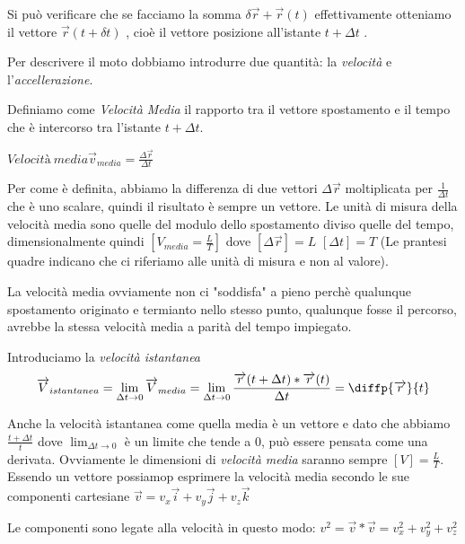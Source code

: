 Si può verificare che se facciamo la somma  $ \delta \overrightarrow{r} + \overrightarrow{r} ( t ) $ effettivamente otteniamo il vettore $ \overrightarrow{r} ( t + \delta t ) $ , cioè il vettore posizione all'istante $ t + \Delta t $ .

Per descrivere il moto dobbiamo introdurre due quantità: la \textit{velocità} e l'\textit{accellerazione}.

Definiamo come \textit{Velocità Media} il rapporto tra il vettore spostamento e il tempo che è intercorso 
tra l'istante $ t + \Delta t$. 


$Velocità\   media \overrightarrow{v}_{media} =\frac{\Delta \overrightarrow{r} }{\Delta t} $ 


Per come è definita, abbiamo la differenza di due vettori $\Delta \overrightarrow{r} $
moltiplicata per $\frac{1}{\Delta t}$ che è uno scalare, quindi il risultato è sempre
un vettore. 
Le unità di misura della velocità media sono quelle del modulo dello spostamento
diviso quelle del tempo, dimensionalmente quindi $[V_{media}= \frac{L}{T} ]$ dove $[\Delta\overrightarrow{r}]= L$
$[\Delta t]= T$ (Le prantesi quadre indicano che ci riferiamo alle unità di misura e non al valore).

La velocità media ovviamente non ci "soddisfa" a pieno perchè qualunque spostamento
originato e termianto nello stesso punto, qualunque fosse il percorso, avrebbe
la stessa velocità media a parità del tempo impiegato.

Introduciamo la \textit{velocità istantanea} 
\begin{equation} 
    \overrightarrow{V}_{istantanea}= 
    \lim_{\Delta t \to 0} \overrightarrow{V}_{media} = 
    \lim_{\Delta t \to 0} \frac { \overrightarrow{r}(t+\Delta t) * \overrightarrow{r}(t) }{\Delta t} = 
    \diffp{\overrightarrow{r}}{t}
\end{equation}

Anche la velocità istantanea come quella media è un vettore e dato che
abbiamo $\frac {t +\Delta t} {t}$ dove $\lim_{\Delta t \to 0}$  è un limite che tende a $0$,
può essere pensata come una derivata.
Ovviamente  le dimensioni di \textit{velocità media}
saranno sempre $[V]=\frac{L}{T}$.
 Essendo un vettore possiamop esprimere la velocità media
 secondo le sue componenti cartesiane 
 $\overrightarrow{v}= v_{x}\overrightarrow{i} + v_{y}\overrightarrow{j} + v_{z}\overrightarrow{k}$

Le componenti sono legate alla velocità in questo modo:
$v^2= \overrightarrow{v}*\overrightarrow{v}= v_{x}^2+v_{y}^2+v_{z}^2$

